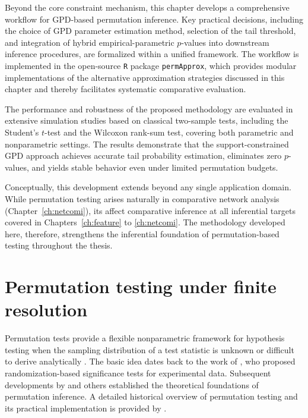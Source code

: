 Beyond the core constraint mechanism, this chapter develops a comprehensive workflow for GPD-based permutation inference. Key practical decisions, including the choice of GPD parameter estimation method, selection of the tail threshold, and integration of hybrid empirical-parametric $p$-values into downstream inference procedures, are formalized within a unified framework. The workflow is implemented in the open-source \texttt{R} package \texttt{permApprox}, which provides modular implementations of the alternative approximation strategies discussed in this chapter and thereby facilitates systematic comparative evaluation.

The performance and robustness of the proposed methodology are evaluated in extensive simulation studies based on classical two-sample tests, including the Student’s $t$-test and the Wilcoxon rank-sum test, covering both parametric and nonparametric settings. The results demonstrate that the support-constrained GPD approach achieves accurate tail probability estimation, eliminates zero $p$-values, and yields stable behavior even under limited permutation budgets.

Conceptually, this development extends beyond any single application domain. 
While permutation testing arises naturally in comparative network analysis (Chapter~\ref{ch:netcomi}), its  affect comparative inference at all inferential targets covered in Chapters~\ref{ch:feature} to \ref{ch:netcomi}. The methodology developed here, therefore, strengthens the inferential foundation of permutation-based testing throughout the thesis.

\section{Permutation testing under finite resolution}
\label{sec:6perm:finite_resolution}

Permutation tests provide a flexible nonparametric framework for hypothesis testing when the sampling distribution of a test statistic is unknown or difficult to derive analytically \citep{good2005permutation}. 
The basic idea dates back to the work of \citet{fisher1935design}, who proposed randomization-based significance tests for experimental data. 
Subsequent developments by \citet{pitman1937significance} and others established the theoretical foundations of permutation inference. 
A detailed historical overview of permutation testing and its practical implementation is provided by \citet{phipson2010permutation}.

